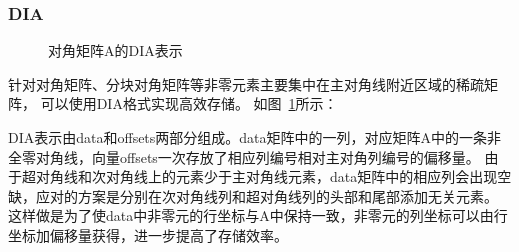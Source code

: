 \documentclass[11pt,twocolumn]{article}
\begin{document}
\subsubsection{DIA}
\begin{figure} 
  \centering 
  \hspace{3in} 
  \caption{对角矩阵A的DIA表示} 
  \label{fig:DIA} %
\end{figure}

针对对角矩阵、分块对角矩阵等非零元素主要集中在主对角线附近区域的稀疏矩阵，
可以使用DIA格式实现高效存储。
如图~\ref{fig:DIA}所示：

DIA表示由data和offsets两部分组成。data矩阵中的一列，对应矩阵A中的一条非全零对角线，向量offsets一次存放了相应列编号相对主对角列编号的偏移量。
由于超对角线和次对角线上的元素少于主对角线元素，data矩阵中的相应列会出现空缺，应对的方案是分别在次对角线列和超对角线列的头部和尾部添加无关元素。
这样做是为了使data中非零元的行坐标与A中保持一致，非零元的列坐标可以由行坐标加偏移量获得，进一步提高了存储效率。
\end{document}
